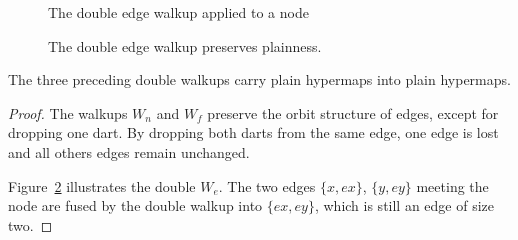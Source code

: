\begin{figure}[htb]
\centering
{}
\caption{The double edge walkup applied to a node}
\label{fig:doubleedge}
\end{figure}

\begin{figure}[htb]
\centering
{}
\caption{The double edge walkup preserves plainness.}
\label{fig:doubleplain}
\end{figure}


\begin{lemma}\label{lemma:dwalk-planar}  
The three preceding double walkups carry plain
hypermaps into plain hypermaps.
\end{lemma}
%

\begin{proof} The walkups $W_n$ and $W_f$ preserve the orbit structure
of edges, except for dropping one dart.  By dropping both darts from
the same edge, one edge is lost and all others edges remain
unchanged.

Figure~\ref{fig:doubleplain} illustrates the double $W_e$.  The two
edges $\{x,e x\}$, $\{y, e y\}$ meeting the node are fused by the
double walkup into $\{e x, e y\}$, which is still an edge of size
two.
\end{proof}


